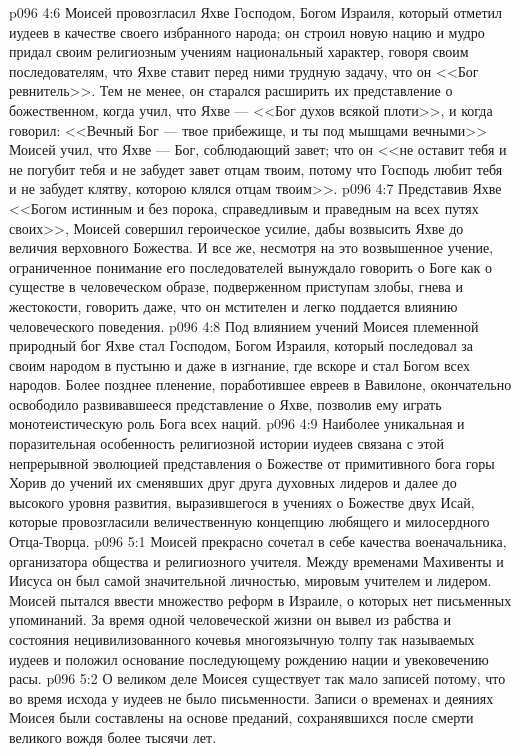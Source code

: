 \vs p096 4:6 Моисей провозгласил Яхве Господом, Богом Израиля, который отметил иудеев в качестве своего избранного народа; он строил новую нацию и мудро придал своим религиозным учениям национальный характер, говоря своим последователям, что Яхве ставит перед ними трудную задачу, что он <<Бог ревнитель>>. Тем не менее, он старался расширить их представление о божественном, когда учил, что Яхве --- <<Бог духов всякой плоти>>, и когда говорил: <<Вечный Бог --- твое прибежище, и ты под мышцами вечными>> Моисей учил, что Яхве --- Бог, соблюдающий завет; что он <<не оставит тебя и не погубит тебя и не забудет завет отцам твоим, потому что Господь любит тебя и не забудет клятву, которою клялся отцам твоим>>.
\vs p096 4:7 Представив Яхве <<Богом истинным и без порока, справедливым и праведным на всех путях своих>>, Моисей совершил героическое усилие, дабы возвысить Яхве до величия верховного Божества. И все же, несмотря на это возвышенное учение, ограниченное понимание его последователей вынуждало говорить о Боге как о существе в человеческом образе, подверженном приступам злобы, гнева и жестокости, говорить даже, что он мстителен и легко поддается влиянию человеческого поведения.
\vs p096 4:8 Под влиянием учений Моисея племенной природный бог Яхве стал Господом, Богом Израиля, который последовал за своим народом в пустыню и даже в изгнание, где вскоре и стал Богом всех народов. Более позднее пленение, поработившее евреев в Вавилоне, окончательно освободило развивавшееся представление о Яхве, позволив ему играть монотеистическую роль Бога всех наций.
\vs p096 4:9 Наиболее уникальная и поразительная особенность религиозной истории иудеев связана с этой непрерывной эволюцией представления о Божестве от примитивного бога горы Хорив до учений их сменявших друг друга духовных лидеров и далее до высокого уровня развития, выразившегося в учениях о Божестве двух Исай, которые провозгласили величественную концепцию любящего и милосердного Отца\hyp{}Творца.
\vs p096 5:1 Моисей прекрасно сочетал в себе качества военачальника, организатора общества и религиозного учителя. Между временами Махивенты и Иисуса он был самой значительной личностью, мировым учителем и лидером. Моисей пытался ввести множество реформ в Израиле, о которых нет письменных упоминаний. За время одной человеческой жизни он вывел из рабства и состояния нецивилизованного кочевья многоязычную толпу так называемых иудеев и положил основание последующему рождению нации и увековечению расы.
\vs p096 5:2 О великом деле Моисея существует так мало записей потому, что во время исхода у иудеев не было письменности. Записи о временах и деяниях Моисея были составлены на основе преданий, сохранявшихся после смерти великого вождя более тысячи лет.

